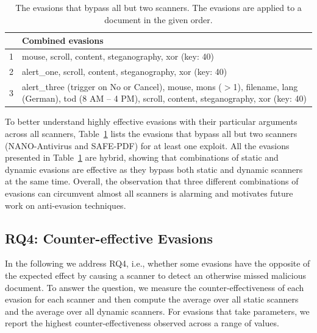 \begin{table}[]
    \small
    \centering
	\caption{The evasions that bypass all but two scanners. The evasions are applied to a document in the given order.}
	\label{t:detected by two}
    \renewcommand*{\arraystretch}{1.2}
    \setlength{\tabcolsep}{5pt}
    \begin{tabular}{rp{25em}}
    \toprule
    &Combined evasions \\
    \midrule
     1 & mouse, scroll, content, steganography, xor (key: 40) \\
     2 & alert\_one, scroll, content, steganography, xor (key: 40) \\
     3 & alert\_three (trigger on No or Cancel), mouse, mons ($>$1), filename, lang (German), tod (8 AM -- 4 PM), scroll, content, steganography, xor (key: 40) \\
    \bottomrule
    \end{tabular}
\end{table}

To better understand highly effective evasions with their particular arguments across all scanners,
Table~\ref{t:detected by two} lists the evasions that bypass all but two scanners (NANO-Antivirus and SAFE-PDF) for at least one exploit.
All the evasions presented in Table~\ref{t:detected by two} are hybrid, showing that
combinations of static and dynamic evasions are effective as they bypass both static and dynamic scanners at the same time.
Overall, the observation that three different combinations of evasions can circumvent almost all scanners is alarming and motivates future work on anti-evasion techniques.


\subsection{RQ4: Counter-effective Evasions}
\label{ss: Counter-effective Evasions}

In the following we address RQ4, i.e., whether some evasions have the opposite of the expected effect by causing a scanner to detect an otherwise missed malicious document.
To answer the question, we measure the counter-effectiveness of each evasion for each scanner and then compute 
the average over all static scanners and the average over all dynamic 
scanners.
For evasions that take parameters, we report the highest counter-effectiveness observed across a range of values.

